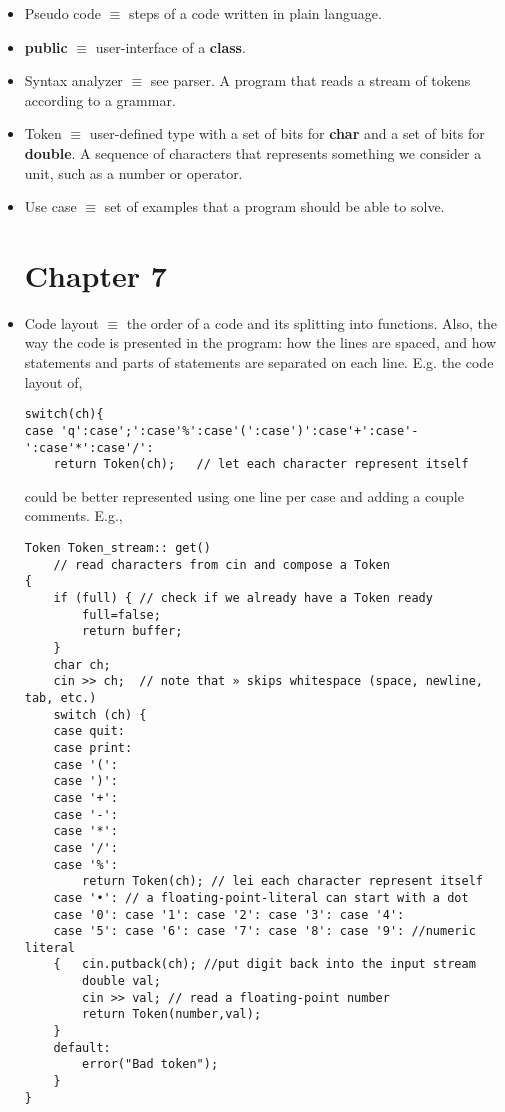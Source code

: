 \documentclass[12pt]{article}
\begin{document}
\begin{itemize}
\item Pseudo code $\equiv$ steps of a code written in plain language.

\item \textbf{public} $\equiv$ user-interface of a \textbf{class}.

\item Syntax analyzer $\equiv$ see parser. A program that reads a stream of tokens according to a grammar.

\item Token $\equiv$ user-defined type with a set of bits for \textbf{char} and a set of bits for \textbf{double}. A sequence of characters that represents something we consider a unit, such as a number or operator.

\item Use case $\equiv$ set of examples that a program should be able to solve.

\section*{Chapter 7}

\item Code layout $\equiv$ the order of a code and its splitting into functions. Also, the way the code is presented in the program: how the lines are spaced, and how statements and parts of statements are separated on each line. E.g. the code layout of,

\begin{lstlisting}
switch(ch){
case 'q':case';':case'%':case'(':case')':case'+':case'-':case'*':case'/':
	return Token(ch);	// let each character represent itself
\end{lstlisting}

could be better represented using one line per case and adding a couple comments. E.g.,

\begin{lstlisting}
Token Token_stream:: get() 
	// read characters from cin and compose a Token 
{ 
	if (full) { // check if we already have a Token ready 
		full=false; 
		return buffer; 
	} 
	char ch; 
	cin >> ch;	// note that » skips whitespace (space, newline, tab, etc.) 
	switch (ch) { 
	case quit: 
	case print: 
	case '(': 
	case ')': 
	case '+': 
	case '-': 
	case '*': 
	case '/': 
	case '%': 
		return Token(ch); // lei each character represent itself 
	case '•': // a floating-point-literal can start with a dot 
	case '0': case '1': case '2': case '3': case '4': 
	case '5': case '6': case '7': case '8': case '9': //numeric literal 
	{ 	cin.putback(ch); //put digit back into the input stream 
		double val; 
		cin >> val; // read a floating-point number 
		return Token(number,val); 
	}
	default:
		error("Bad token"); 
	} 
} 


\end{lstlisting}
\end{itemize}
\end{document}

